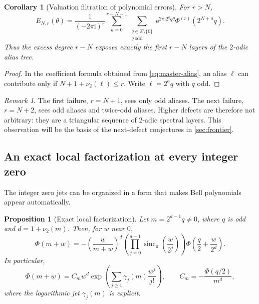 \documentclass[11pt]{article}
\numberwithin{equation}{section}
\newtheorem{proposition}[theorem]{Proposition}
\newtheorem{corollary}[theorem]{Corollary}
\theoremstyle{definition}
\theoremstyle{remark}
\newtheorem{remark}[theorem]{Remark}
\newcommand{\Z}{\mathbb Z}
\newcommand{\sincpi}{\operatorname{sinc}_{\pi}}
\newcommand{\e}{\mathrm e}
\newcommand{\iu}{\mathrm i}
\begin{document}
\begin{corollary}[Valuation filtration of polynomial errors]
\label{cor:valuation-filtration}
For $r>N$,
\begin{equation}
 E_{N,r}(\theta)
 =\frac1{(-2\pi\iu)^r}
 \sum_{a=0}^{r-N-1}
 \sum_{\substack{q\in\Z\setminus\{0\}\\q\ \mathrm{odd}}}
 \e^{2\pi\iu 2^aq\theta}
 \Phi^{(r)}(2^{N+a}q).
 \label{eq:valuation-filtration}
\end{equation}
Thus the excess degree $r-N$ exposes exactly the first $r-N$ layers of the $2$-adic alias tree.
\end{corollary}

\begin{proof}
In the coefficient formula obtained from \eqref{eq:master-alias}, an alias $\ell$ can contribute only if
$N+1+\nu_2(\ell)\le r$.  Write $\ell=2^aq$ with $q$ odd.
\end{proof}

\begin{remark}
The first failure, $r=N+1$, sees only odd aliases.  The next failure, $r=N+2$, sees odd aliases and twice-odd aliases.  Higher defects are therefore not arbitrary: they are a triangular sequence of $2$-adic spectral layers.  This observation will be the basis of the next-defect conjectures in \cref{sec:frontier}.
\end{remark}

\subsection{An exact local factorization at every integer zero}

The integer zero jets can be organized in a form that makes Bell polynomials appear automatically.

\begin{proposition}[Exact local factorization]
\label{prop:local-factorization}
Let $m=2^{d-1}q\ne0$, where $q$ is odd and $d=1+\nu_2(m)$.  Then, for $w$ near $0$,
\begin{equation}
 \boxed{\displaystyle
 \Phi(m+w)
 =-\left(\frac{w}{m+w}\right)^d
 \left(\prod_{j=0}^{d-1}\sincpi\!\left(\frac{w}{2^j}\right)\right)
 \Phi\!\left(\frac q2+\frac{w}{2^d}\right).}
 \label{eq:local-factorization}
\end{equation}
In particular,
\begin{equation}
 \Phi(m+w)=C_mw^d
 \exp\!\left(\sum_{j\ge1}\gamma_j(m)\frac{w^j}{j!}\right),
 \qquad
 C_m=-\frac{\Phi(q/2)}{m^d},
 \label{eq:local-Bell-form}
\end{equation}
where the logarithmic jet $\gamma_j(m)$ is explicit.
\end{proposition}
\end{document}

